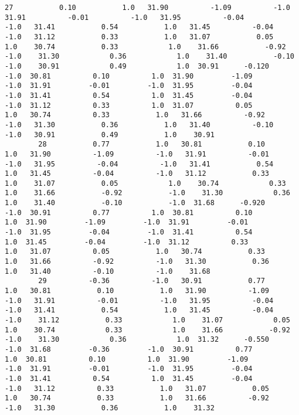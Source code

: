 \documentclass[11pt]{article}
\begin{document}
\begin{Verbatim}[commandchars=\\\{\}]
        27           0.10           1.0   31.90          -1.09          -1.0   31.91          -0.01          -1.0   31.95          -0.04          -1.0   31.41           0.54           1.0   31.45          -0.04          -1.0   31.12           0.33           1.0   31.07           0.05           1.0    30.74           0.33            1.0    31.66           -0.92           -1.0    31.30            0.36            1.0    31.40           -0.10           -1.0    30.91            0.49            1.0  30.91      -0.120         -1.0  30.81          0.10          1.0  31.90         -1.09         -1.0  31.91         -0.01         -1.0  31.95         -0.04         -1.0  31.41          0.54          1.0  31.45         -0.04         -1.0  31.12          0.33          1.0  31.07          0.05          1.0   30.74          0.33           1.0   31.66          -0.92          -1.0   31.30           0.36           1.0   31.40          -0.10          -1.0   30.91           0.49           1.0    30.91   
        28           0.77           1.0   30.81           0.10           1.0   31.90          -1.09          -1.0   31.91          -0.01          -1.0   31.95          -0.04          -1.0   31.41           0.54           1.0   31.45          -0.04          -1.0   31.12           0.33           1.0    31.07           0.05            1.0    30.74            0.33            1.0    31.66           -0.92           -1.0    31.30            0.36            1.0    31.40           -0.10           -1.0  31.68      -0.920         -1.0  30.91          0.77          1.0  30.81          0.10          1.0  31.90         -1.09         -1.0  31.91         -0.01         -1.0  31.95         -0.04         -1.0  31.41          0.54          1.0  31.45         -0.04         -1.0  31.12          0.33          1.0   31.07          0.05           1.0   30.74           0.33           1.0   31.66          -0.92          -1.0   31.30           0.36           1.0   31.40          -0.10          -1.0    31.68   
        29          -0.36          -1.0   30.91           0.77           1.0   30.81           0.10           1.0   31.90          -1.09          -1.0   31.91          -0.01          -1.0   31.95          -0.04          -1.0   31.41           0.54           1.0   31.45          -0.04          -1.0    31.12           0.33            1.0    31.07            0.05            1.0    30.74            0.33            1.0    31.66           -0.92           -1.0    31.30            0.36            1.0  31.32      -0.550         -1.0  31.68         -0.36         -1.0  30.91          0.77          1.0  30.81          0.10          1.0  31.90         -1.09         -1.0  31.91         -0.01         -1.0  31.95         -0.04         -1.0  31.41          0.54          1.0  31.45         -0.04         -1.0   31.12          0.33           1.0   31.07           0.05           1.0   30.74           0.33           1.0   31.66          -0.92          -1.0   31.30           0.36           1.0    31.32   

\end{Verbatim}
\end{document}
